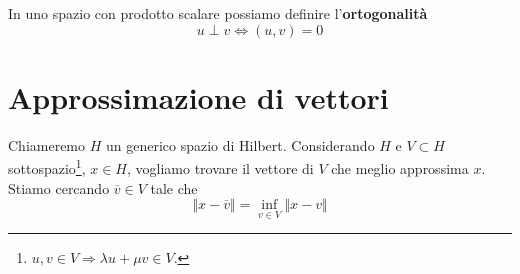 \documentclass[10pt,a4paper,twoside,openright]{book}
\begin{document}
In uno spazio con prodotto scalare possiamo definire l'\textbf{ortogonalità}
\begin{equation*}
	u\perp v\Leftrightarrow (u,v) =0
\end{equation*}
\section{Approssimazione di vettori}

Chiameremo $H$ un generico spazio di Hilbert. Considerando $\displaystyle H$ e $V\subset H$ sottospazio\footnote{$u,v\in V\Rightarrow \lambda u+\mu v\in V$.}, $x\in H$, vogliamo trovare il vettore di $V$ che meglio approssima $x$. Stiamo cercando $\overline{v} \in V$ tale che
\begin{equation*}
	\Vert x-\overline{v}\Vert =\inf_{v\in V}\Vert x-v\Vert 
\end{equation*}
\end{document}
